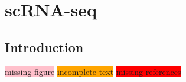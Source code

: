 



\newpage

\section{scRNA-seq}  %
\label{sec:scrna}

\subsection{Introduction}
\label{sec:scrna_intro}

\colorbox{pink}{missing figure} \colorbox{orange}{incomplete text} \colorbox{red}{missing references} \\\\

